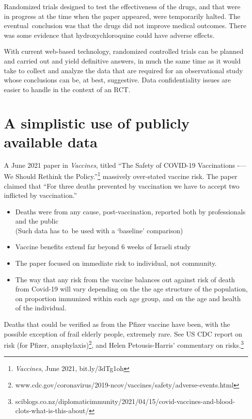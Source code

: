 \documentclass[
  10pt,
  b5paper]{book}
\providecommand{\tightlist}{%
  \setlength{\itemsep}{0pt}\setlength{\parskip}{0pt}}
\begin{document}
Randomized trials designed to test the effectiveness of the drugs,
and that were in progress at the time when the paper appeared,
were temporarily halted. The eventual~conclusion was that the
drugs did not improve medical outcomes. There was some evidence
that hydroxychloroquine could have adverse effects.

With current web-based technology, randomized controlled trials
can be planned and carried out and yield definitive answers, in
much the same time as it would take to collect and analyze the
data that are required for an observational study whose
conclusions can be, at best, suggestive. Data confidentiality
issues are easier to handle in the context of an RCT.

\hypertarget{a-simplistic-use-of-publicly-available-data}{%
\section{A simplistic use of publicly available data}\label{a-simplistic-use-of-publicly-available-data}}

A June 2021 paper in \emph{Vaccines}, titled
``The Safety of COVID-19 Vaccinations -\/--- We Should Rethink the Policy.''\footnote{\emph{Vaccines}, June 2021, bit.ly/3dTg1oh}
massively over-stated vaccine risk. The paper claimed that
``For three deaths prevented by vaccination we have to accept
two inflicted by vaccination.''

\begin{itemize}
\tightlist
\item
  Deaths were from any cause, post-vaccination, reported both by
  professionals and the public\\
  (Such data has to~be used with a `baseline' comparison)
\item
  Vaccine benefits extend far beyond 6 weeks of Israeli study
\item
  The paper focused on immediate risk to individual, not community.
\item
  The way that any risk from the vaccine balances out against
  risk of death from Covid-19 will vary depending on the the age
  structure of the population, on proportion immunized within
  each age group, and on the age and health of the individual.
\end{itemize}

Deaths that could be verified as from the Pfizer vaccine have been,
with the possible exception of frail elderly people, extremely rare.
See US CDC report on risk (for Pfizer, anaphylaxis)\footnote{www.cdc.gov/coronavirus/2019-ncov/vaccines/safety/adverse-events.html},
and Helen Petousis-Harris' commentary on risks.\footnote{sciblogs.co.nz/diplomaticimmunity/2021/04/15/covid-vaccines-and-blood-clots-what-is-this-about/}
\end{document}
